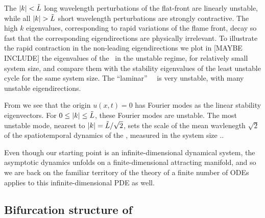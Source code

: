 The $|k|<\tilde{L}$ 
long wavelength perturbations of the flat-front {\eqv}
are linearly unstable, while all 
$|k|> \tildeL$ short wavelength perturbations are strongly contractive.  
The high $k$ eigenvalues, corresponding to rapid variations of
the flame front, decay so fast that the corresponding eigendirections
are physically irrelevant.
To illustrate the rapid contraction in the non-leading eigendirections
we plot  in [MAYBE INCLUDE] %
the eigenvalues of the \eqv\ in the unstable regime,
for relatively small system size, %
and compare them with the
stability eigenvalues of the least unstable cycle for the same 
system size.
The ``laminar'' ~\eqv\ is very unstable,
with many unstable eigendirections. 


From  we see that the origin $u(x,t) = 0$
has Fourier modes as the  linear
stability eigenvectors. 
For $0 \leq |k| \leq \tilde{L}$, these Fourier modes are
unstable.
The most unstable mode, nearest to $|k|=\tilde{L}/\sqrt{2}$,
sets the scale of the mean wavlenegth $\sqrt{2}$
of the spatiotemporal dynamics of the {\KSe},
measured in the system size \tildeL..


% 
% 

Even though our starting point
is an infinite-dimensional dynamical system, the asymptotic dynamics
unfolds on a finite-dimensional attracting manifold, and so we are back on
the familiar territory of 
the theory of a finite number of ODEs applies to this
infinite-dimensional PDE as well.

\subsection{Bifurcation structure of \KS}
\label{sec:KSlit}
%

